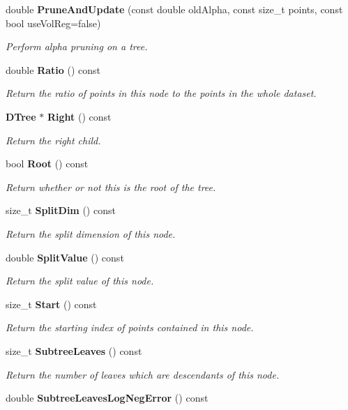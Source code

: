 \begin{DoxyCompactItemize}
double {\bf Prune\-And\-Update} (const double old\-Alpha, const size\-\_\-t points, const bool use\-Vol\-Reg=false)
\begin{DoxyCompactList}\small\item\em Perform alpha pruning on a tree. \end{DoxyCompactList}\item 
double {\bf Ratio} () const 
\begin{DoxyCompactList}\small\item\em Return the ratio of points in this node to the points in the whole dataset. \end{DoxyCompactList}\item 
{\bf D\-Tree} $\ast$ {\bf Right} () const 
\begin{DoxyCompactList}\small\item\em Return the right child. \end{DoxyCompactList}\item 
bool {\bf Root} () const 
\begin{DoxyCompactList}\small\item\em Return whether or not this is the root of the tree. \end{DoxyCompactList}\item 
size\-\_\-t {\bf Split\-Dim} () const 
\begin{DoxyCompactList}\small\item\em Return the split dimension of this node. \end{DoxyCompactList}\item 
double {\bf Split\-Value} () const 
\begin{DoxyCompactList}\small\item\em Return the split value of this node. \end{DoxyCompactList}\item 
size\-\_\-t {\bf Start} () const 
\begin{DoxyCompactList}\small\item\em Return the starting index of points contained in this node. \end{DoxyCompactList}\item 
size\-\_\-t {\bf Subtree\-Leaves} () const 
\begin{DoxyCompactList}\small\item\em Return the number of leaves which are descendants of this node. \end{DoxyCompactList}\item 
double {\bf Subtree\-Leaves\-Log\-Neg\-Error} () const 

\end{DoxyCompactItemize}
